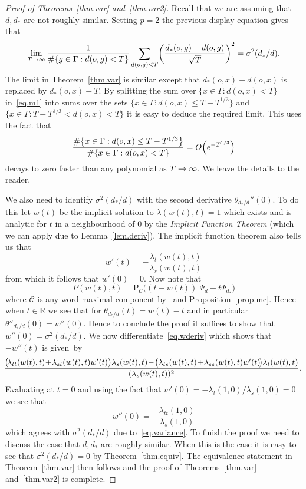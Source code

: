 \documentclass[AHL,Unicode,longabstracts,published]{cedram}
\newcommand{\G}{\Gamma}
\renewcommand{\P}{\Psi}
\newcommand{\Cc}{\mathcal{C}}
\newcommand{\R}{\mathbb{R}}
\newcommand*\rmP{\mathrm{P}}
\let\originalleft\left
\let\originalright\right
\renewcommand{\left}{\mathopen{}\mathclose\bgroup\originalleft}
\renewcommand{\right}{\aftergroup\egroup\originalright}
\renewcommand*{\to}{\mathchoice{\longrightarrow}{\rightarrow}{\rightarrow}{\rightarrow}}
\newcounter{setofcase}
\newcounter{case}[setofcase]
\theoremstyle{plain}
\newcommand{\G}{\Gamma}
\begin{document}
\begin{proof}[Proof of Theorems~\ref{thm.var} and~\ref{thm.var2}]
Recall that we are assuming that $d,d_\ast$ are not roughly similar. Setting $p=2$ the previous display equation gives that
\begin{equation}\label{eq.m1}
\lim_{T\to\infty} \frac{1}{\#\left\{ g\in\G: d(o,g) < T\right\}} \sum_{d(o,g) < T} \left(\frac{d_\ast(o,g) - d(o,g)}{\sqrt{T}} \right)^2 = \sigma^2(d_\ast/d).
\end{equation}
The limit in Theorem~\ref{thm.var} is similar except that $d_\ast(o,x) - d(o,x)$ is replaced by $d_\ast(o,x) - T$. By splitting the sum over $\{ x \in\G: d(o,x) <T\}$ in~\eqref{eq.m1} into sums over the sets $\{ x\in\G: d(o,x) \le T-T^{1/3}\}$ and $\{ x\in\G: T-T^{1/3} < d(o,x) < T\}$ it is easy to deduce the required limit. This uses the fact that
\[
\frac{\#\left\{ x\in\G: d(o,x) \le T-T^{1/3}\right\}}{\#\{x \in \G : d(o,x) < T\}} = O\left(e^{-T^{1/3}}\right)
\]
decays to zero faster than any polynomial as $T\to\infty$. We leave the details to the reader.

We also need to identify $\sigma^2(d_\ast/d)$ with the second derivative $\theta_{d_\ast/d}''(0)$. To do this let $w(t)$ be the implicit solution to $\lambda(w(t),t) = 1$ which exists and is analytic for $t$ in a neighbourhood of $0$ by the \emph{Implicit Function Theorem} (which we can apply due to Lemma~\ref{lem.deriv}). The {implicit function theorem} also tells us that
\begin{equation}\label{eq.wderiv}
w'(t) = - \frac{\lambda_t(w(t), t)}{\lambda_s(w(t),t)}
\end{equation}
from which it follows that $w'(0) = 0$. Now note that
\[
P(w(t), t) = \rmP_\Cc\bigl((t-w(t))\; \P_d - t\P_{d_\ast}\bigr)
\]
where $\Cc$ is any word maximal component by~\cite[Theorem~5.4]{cantrell.tanaka.2} and Proposition~\ref{prop.mc}. Hence when $t \in \R$ we see that for $\theta_{d_\ast/d}(t) = w(t) - t$ and in particular $\theta''_{d_\ast/d}(0) = w''(0)$. Hence to conclude the proof it suffices to show that $w''(0) = \sigma^2(d_\ast/d)$. We now differentiate~\eqref{eq.wderiv} which shows that $ - w''(t)$ is given~by
\[
\mkern-5mu
\frac{
\bigl(\!\lambda_{t t}(w(t), t)\! +\! \lambda_{s t}(w(t),t)w'(t)\bigr) \lambda_s(w(t),t)\!-\! \bigl(\lambda_{t s}(w(t), t)\! +\!\lambda_{s s}(w(t), t) w'(t)\!\bigr) \lambda_t(w(t),t)
}{(\lambda_s(w(t),t))^2}.
\]
Evaluating at $t = 0$ and using the fact that $w'(0) = -\lambda_t(1,0)/\lambda_s(1,0) = 0 $ we see that
\[
w''(0) = - \frac{\lambda_{t t}(1,0)}{\lambda_s(1,0)}
\]
which agrees with $\sigma^2(d_\ast/d)$ due to~\eqref{eq.variance}. To finish the proof we need to discuss the case that $d,d_\ast$ are roughly similar. When this is the case it is easy to see that $\sigma^2(d_\ast/d) = 0$ by Theorem~\ref{thm.equiv}. The equivalence statement in Theorem~\ref{thm.var} then follows and the proof of Theorems~\ref{thm.var} and~\ref{thm.var2} is complete.
\end{proof}
\end{document}
